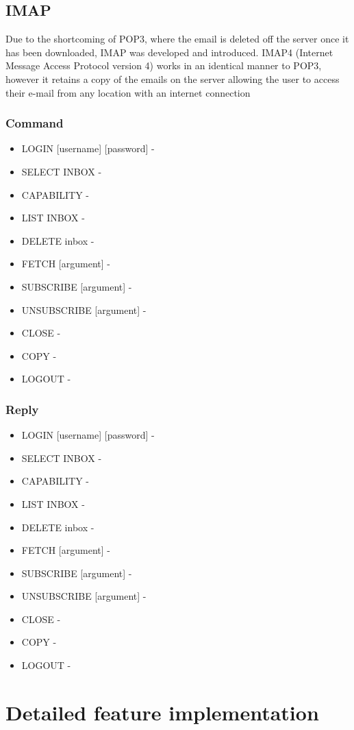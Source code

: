 \documentclass[11pt]{article}
\begin{document}
\begin{multicols}{2}
\subsection{IMAP}
Due to the shortcoming of POP3, where the email is deleted off the server once it has been downloaded, IMAP was developed and introduced. IMAP4 (Internet Message Access Protocol version 4) works in an identical manner to POP3, however it retains a copy of the emails on the server allowing the user to access their e-mail from any location with an internet connection
\subsubsection{Command}
\begin{itemize}
  \item LOGIN [username] [password] - 
  \item SELECT INBOX - 
  \item CAPABILITY - 
  \item LIST INBOX - 
  \item DELETE inbox - 
  \item FETCH [argument] - 
  \item SUBSCRIBE [argument] - 
  \item UNSUBSCRIBE [argument] - 
  \item CLOSE - 
  \item COPY - 
  \item LOGOUT - 
\end{itemize}
\subsubsection{Reply}
\begin{itemize}
  \item LOGIN [username] [password] - 
  \item SELECT INBOX - 
  \item CAPABILITY - 
  \item LIST INBOX - 
  \item DELETE inbox - 
  \item FETCH [argument] - 
  \item SUBSCRIBE [argument] - 
  \item UNSUBSCRIBE [argument] - 
  \item CLOSE - 
  \item COPY - 
  \item LOGOUT - 
\end{itemize}
\section{Detailed feature implementation}


\end{multicols}
\end{document}
